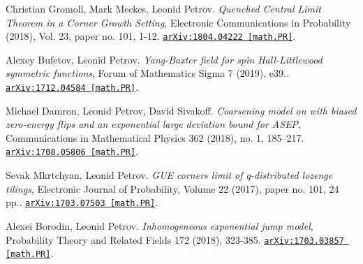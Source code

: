 \documentclass[letterpaper,11pt]{article}
\begin{document}
\begin{etaremune}
	
	
	
	
	
	
	
	
	
	
	\item 
	Christian Gromoll, Mark Meckes, Leonid Petrov.
	\emph{Quenched Central Limit Theorem in a Corner Growth Setting}, Electronic Communications in Probability (2018), Vol. 23, paper no. 101, 1-12. 
	\href{https://arxiv.org/abs/1804.04222}{\texttt{arXiv:1804.04222 [math.PR]}}.
	
	
	
	
	
	
	
	
	
	
	
	
	
	\item 
	Alexey Bufetov, Leonid Petrov.
	\emph{Yang-Baxter field for spin Hall-Littlewood symmetric functions}, Forum of Mathematics Sigma 7 (2019), e39.. 
	\href{https://arxiv.org/abs/1712.04584}{\texttt{arXiv:1712.04584 [math.PR]}}.
	
	
	
	
	
	
	
	
	
	
	
	
	
	\item 
	Michael Damron, Leonid Petrov, David Sivakoff.
	\emph{Coarsening model on  with biased zero-energy flips and an exponential large deviation bound for ASEP}, Communications in Mathematical Physics 362 (2018), no. 1, 185–217. 
	\href{https://arxiv.org/abs/1708.05806}{\texttt{arXiv:1708.05806 [math.PR]}}.
	
	
	
	
	
	
	
	
	
	
	
	
	
	
	
	
	
	\item 
	Sevak Mkrtchyan, Leonid Petrov.
	\emph{GUE corners limit of q-distributed lozenge tilings}, Electronic Journal of Probability, Volume 22 (2017), paper no. 101, 24 pp.. 
	\href{https://arxiv.org/abs/1703.07503}{\texttt{arXiv:1703.07503 [math.PR]}}.
	
	
	
	\item 
	Alexei Borodin, Leonid Petrov.
	\emph{Inhomogeneous exponential jump model}, Probability Theory and Related Fields 172 (2018), 323-385. 
	\href{https://arxiv.org/abs/1703.03857}{\texttt{arXiv:1703.03857 [math.PR]}}.
	

\end{etaremune}
\end{document}

